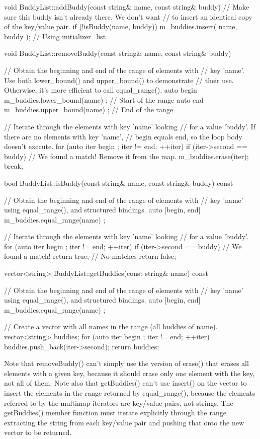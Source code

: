 \begin{cpp}
void BuddyList::addBuddy(const string& name, const string& buddy)
{
    // Make sure this buddy isn't already there. We don't want
    // to insert an identical copy of the key/value pair.
    if (!isBuddy(name, buddy)) {
        m_buddies.insert({ name, buddy }); // Using initializer_list
    }
}

void BuddyList::removeBuddy(const string& name, const string& buddy)
{
    // Obtain the beginning and end of the range of elements with
    // key 'name'. Use both lower_bound() and upper_bound() to demonstrate
    // their use. Otherwise, it's more efficient to call equal_range().
    auto begin { m_buddies.lower_bound(name) }; // Start of the range
    auto end { m_buddies.upper_bound(name) }; // End of the range

    // Iterate through the elements with key 'name' looking
    // for a value 'buddy'. If there are no elements with key 'name',
    // begin equals end, so the loop body doesn't execute.
    for (auto iter { begin }; iter != end; ++iter) {
        if (iter->second == buddy) {
            // We found a match! Remove it from the map.
            m_buddies.erase(iter);
            break;
        }
    }
}

bool BuddyList::isBuddy(const string& name, const string& buddy) const
{
    // Obtain the beginning and end of the range of elements with
    // key 'name' using equal_range(), and structured bindings.
    auto [begin, end] { m_buddies.equal_range(name) };

    // Iterate through the elements with key 'name' looking
    // for a value 'buddy'.
    for (auto iter { begin }; iter != end; ++iter) {
        if (iter->second == buddy) {
            // We found a match!
            return true;
        }
    }
    // No matches
    return false;
}

vector<string> BuddyList::getBuddies(const string& name) const
{
    // Obtain the beginning and end of the range of elements with
    // key 'name' using equal_range(), and structured bindings.
    auto [begin, end] { m_buddies.equal_range(name) };

    // Create a vector with all names in the range (all buddies of name).
    vector<string> buddies;
    for (auto iter { begin }; iter != end; ++iter) {
        buddies.push_back(iter->second);
    }
    return buddies;
}
\end{cpp}

Note that removeBuddy() can’t simply use the version of erase() that erases all elements with a given key, because it should erase only one element with the key, not all of them. Note also that getBuddies() can’t use insert() on the vector to insert the elements in the range returned by equal\_range(), because the elements referred to by the multimap iterators are key/value pairs, not strings. The getBuddies() member function must iterate explicitly through the range extracting the string from each key/value pair and pushing that onto the new vector to be returned.

